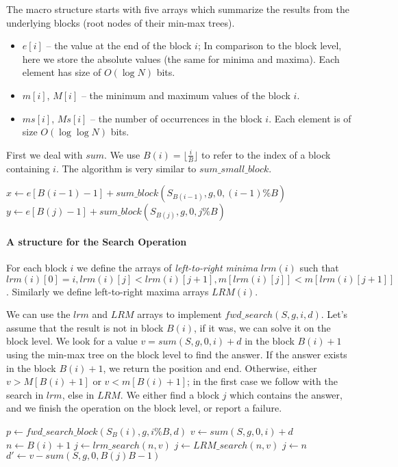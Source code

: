 The macro structure starts with five arrays which summarize the results from the underlying blocks (root nodes of their min-max trees).
\begin{itemize}
	\item $e[i]$ --  the value at the end of the block $i$;
	In comparison to the block level, here we store the absolute values (the same for minima and maxima).
	Each element has size of $O(\log N)$ bits.
	\item $m[i]$, $M[i]$ -- the minimum and maximum values of the block $i$.
	\item $ms[i]$, $Ms[i]$ -- the number of occurrences in the block $i$.
	Each element is of size $O(\log\log N)$ bits.
\end{itemize}

First we deal with $sum$.
We use $B(i) = \lfloor\frac{i}{B}\rfloor$ to refer to the index of a block containing $i$.
The algorithm is very similar to $sum\_small\_block$.

\begin{algorithmic}
	\State $x \gets e[B(i - 1) - 1] + sum\_block(S_{B(i - 1)}, g, 0, (i - 1) \% B)$
	\State $y \gets e[B(j) - 1] + sum\_block(S_{B(j)}, g, 0, j \% B)$
	\State {}
\EndFunction
\end{algorithmic}

\paragraph{A structure for the Search Operation}

For each block $i$ we define the arrays of \emph{left-to-right minima} $lrm(i)$ such that $lrm(i)[0] = i, lrm(i)[j] < lrm(i)[j+1], m[lrm(i)[j]] < m[lrm(i)[j+1]]$.
Similarly we define left-to-right maxima arrays $LRM(i)$.

We can use the $lrm$ and $LRM$ arrays to implement $fwd\_search(S, g, i, d)$.
Let's assume that the result is not in block $B(i)$, if it was, we can solve it on the block level.
We look for a value $v = sum(S, g, 0, i) + d$ in the block $B(i) + 1$ using the min-max tree on the block level to find the answer.
If the answer exists in the block $B(i)+1$, we return the position and end.
Otherwise, either $v > M[B(i) + 1]$ or $v < m[B(i) + 1]$; in the first case we follow with the search in $lrm$, else in $LRM$.
We either find a block $j$ which contains the answer, and we finish the operation on the block level, or report a failure.

\begin{algorithmic}
	\State $p \gets fwd\_search\_block(S_B(i), g, i \% B, d)$
		\State {}
	\Else
		\State $v \gets sum(S, g, 0, i) + d$
		\State $n \gets B(i) + 1$
			\State $j \gets lrm\_search(n, v)$
			\State $j \gets LRM\_search(n, v)$
		\Else
			\State $j \gets n$
		\EndIf
			\State {}
		\Else
			\State $d' \gets v - sum(S, g, 0, B(j) B - 1)$
			\State {}
		\EndIf
	\EndIf
\EndFunction
\end{algorithmic}

